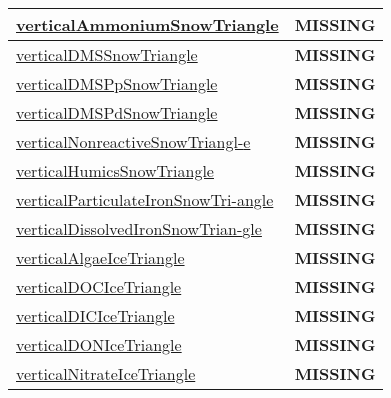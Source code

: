 {\begin{center}
\begin{longtable}{| p{2.0in} | p{4.0in} |}
    \hline
    \hyperref[subsec:var_sec_tracer_triangles_verticalAmmoniumSnowTriangle]{verticalAmmoniumSnowTriangle} & {\bf \color{red} MISSING} \\
    \hline
    \hyperref[subsec:var_sec_tracer_triangles_verticalDMSSnowTriangle]{verticalDMSSnowTriangle} & {\bf \color{red} MISSING} \\
    \hline
    \hyperref[subsec:var_sec_tracer_triangles_verticalDMSPpSnowTriangle]{verticalDMSPpSnowTriangle} & {\bf \color{red} MISSING} \\
    \hline
    \hyperref[subsec:var_sec_tracer_triangles_verticalDMSPdSnowTriangle]{verticalDMSPdSnowTriangle} & {\bf \color{red} MISSING} \\
    \hline
    \hyperref[subsec:var_sec_tracer_triangles_verticalNonreactiveSnowTriangle]{verticalNonreactiveSnowTriangl-}\hyperref[subsec:var_sec_tracer_triangles_verticalNonreactiveSnowTriangle]{e  }& {\bf \color{red} MISSING} \\
    \hline
    \hyperref[subsec:var_sec_tracer_triangles_verticalHumicsSnowTriangle]{verticalHumicsSnowTriangle} & {\bf \color{red} MISSING} \\
    \hline
    \hyperref[subsec:var_sec_tracer_triangles_verticalParticulateIronSnowTriangle]{verticalParticulateIronSnowTri-}\hyperref[subsec:var_sec_tracer_triangles_verticalParticulateIronSnowTriangle]{angle  }& {\bf \color{red} MISSING} \\
    \hline
    \hyperref[subsec:var_sec_tracer_triangles_verticalDissolvedIronSnowTriangle]{verticalDissolvedIronSnowTrian-}\hyperref[subsec:var_sec_tracer_triangles_verticalDissolvedIronSnowTriangle]{gle  }& {\bf \color{red} MISSING} \\
    \hline
    \hyperref[subsec:var_sec_tracer_triangles_verticalAlgaeIceTriangle]{verticalAlgaeIceTriangle} & {\bf \color{red} MISSING} \\
    \hline
    \hyperref[subsec:var_sec_tracer_triangles_verticalDOCIceTriangle]{verticalDOCIceTriangle} & {\bf \color{red} MISSING} \\
    \hline
    \hyperref[subsec:var_sec_tracer_triangles_verticalDICIceTriangle]{verticalDICIceTriangle} & {\bf \color{red} MISSING} \\
    \hline
    \hyperref[subsec:var_sec_tracer_triangles_verticalDONIceTriangle]{verticalDONIceTriangle} & {\bf \color{red} MISSING} \\
    \hline
    \hyperref[subsec:var_sec_tracer_triangles_verticalNitrateIceTriangle]{verticalNitrateIceTriangle} & {\bf \color{red} MISSING} \\

\end{longtable}
\end{center}}
